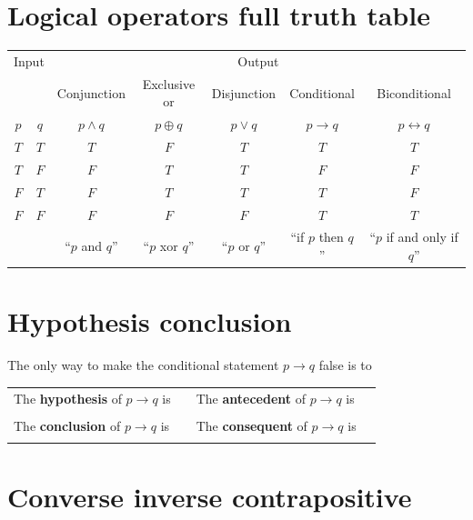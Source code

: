 \documentclass[12pt, oneside]{article}
\begin{document}
\section*{Logical operators full truth table}


\begin{center}
    \begin{tabular}{cc||c|c|c|c|c}
    \multicolumn{2}{c||}{Input}  & \multicolumn{5}{c}{Output} \\
     & & Conjunction &  Exclusive or & Disjunction  &  Conditional & Biconditional  \\
    $p$ & $q$ & $p \wedge q$ &  $p  \oplus  q$ & $p \vee  q$ & $p \to q$ & $p \leftrightarrow q$\\
    \hline
    $T$ & $T$ & $T$ & $F$ & $T$ & $T$& $T$\\
    $T$ & $F$ & $F$ & $T$ & $T$ & $F$& $F$\\
    $F$ & $T$ & $F$ & $T$ & $T$ & $T$& $F$\\
    $F$ & $F$ & $F$ & $F$ & $F$ & $T$& $T$\\
    \hline
    && ``$p$ and $q$'' & ``$p$ xor $q$'' & ``$p$ or $q$'' & ``if $p$ then $q$'' & ``$p$ if and only if $q$''
    \end{tabular}
\end{center}
     \vfill
\section*{Hypothesis conclusion}


The only way to make  the conditional statement $p \to q$ false is to \underline{\phantom{\hspace{3in}}}\\

\begin{tabular}{llll}
The {\bf  hypothesis}  of $p \to q$ is  &\underline{\phantom{\hspace{1in}}} &
The {\bf  antecedent}  of $p \to q$ is  &\underline{\phantom{\hspace{1in}}} \\
&&&  \\
The {\bf  conclusion}  of $p \to q$ is & \underline{\phantom{\hspace{1in}}}&
The {\bf  consequent}  of $p \to q$ is & \underline{\phantom{\hspace{1in}}}\\
&&&  \\
\end{tabular}
 \vfill
\section*{Converse inverse contrapositive}
\end{document}
